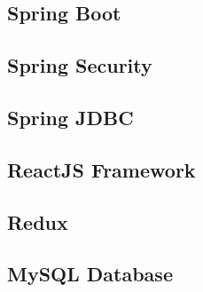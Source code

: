 
\subsection{Spring Boot}
\label{subsection:springBoot}

\subsection{Spring Security}
\label{subsection:proposedSolution}

\subsection{Spring JDBC}
\label{subsection:springJDBC}

\subsection{ReactJS Framework}
\label{section:reactJSFramework}

\subsection{Redux}
\label{section:redux}

\subsection{MySQL Database}
\label{section:mysqlDatabase}





\cite{buildingRESTfulWebServicesWithSpring}
\cite{tamingTheStateInReact}
\cite{highPerformanceMySQL}


